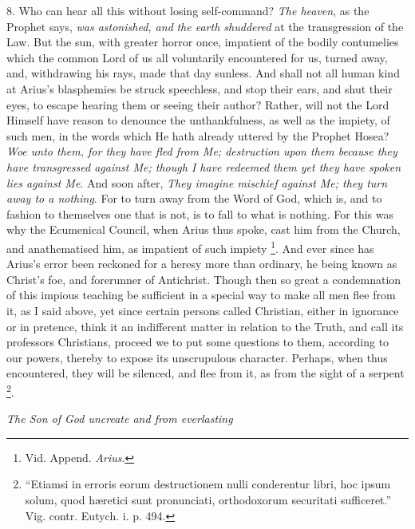 8. Who can hear all this
without losing self-command? \emph{The heaven}, as the Prophet says, \emph{was
astonished, and} \emph{the earth shuddered} at the transgression of
the Law. But the sun, with greater horror once, impatient of the
bodily contumelies which the common Lord of us all voluntarily
encountered for us, turned away, and, withdrawing his rays, made that
day sunless. And shall not all human kind at Arius's blasphemies be
struck speechless, and stop their ears, and shut their eyes, to escape
hearing them or seeing their author? Rather, will not the Lord Himself
have reason to denounce the unthankfulness, as well as the impiety, of
such men, in the words which He hath already uttered by the Prophet
Hosea? \emph{Woe unto them, for they have fled from Me; destruction upon
them because they have transgressed against Me; though I have redeemed
them yet they have spoken lies against Me}. And soon after, \emph{They
imagine mischief against Me; they turn away to a nothing}. For to
turn away from the Word of God, which is, and to fashion to themselves
one that is not, is to fall to what is nothing. For this was why the
Ecumenical Council, when Arius thus spoke, cast him from the Church,
and anathematised him, as impatient of such impiety \footnote{Vid. Append. \emph{Arius}.}. And ever since has Arius's error been reckoned for a heresy
more than ordinary, he being known as Christ's foe, and forerunner of
Antichrist. Though then so great a condemnation of this impious
teaching be sufficient in a special way to make all men flee from it,
as I said above, yet since certain persons called Christian, either in
ignorance or in pretence, think it an indifferent matter in relation
to the Truth, and call its professors Christians, proceed we to put
some questions to them, according to our powers, thereby to expose its
unscrupulous character. Perhaps, when thus encountered, they will be
silenced, and flee from it, as from the sight of a serpent \footnote{``Etiamsi in erroris eorum destructionem nulli conderentur libri, hoc
ipsum solum, quod hæretici sunt pronunciati, orthodoxorum securitati
sufficeret.'' Vig. contr. Eutych. i. p. 494.}.


\emph{The
Son of God uncreate and from everlasting}

